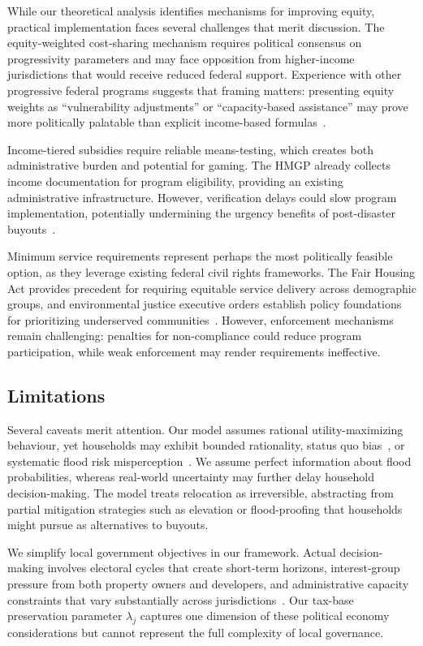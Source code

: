 \documentclass[11pt,letterpaper]{article}
\theoremstyle{definition}
\begin{document}
While our theoretical analysis identifies mechanisms for improving equity, practical implementation faces several challenges that merit discussion. The equity-weighted cost-sharing mechanism requires political consensus on progressivity parameters and may face opposition from higher-income jurisdictions that would receive reduced federal support. Experience with other progressive federal programs suggests that framing matters: presenting equity weights as ``vulnerability adjustments'' or ``capacity-based assistance'' may prove more politically palatable than explicit income-based formulas~\cite{banzhaf2019environmental}.

Income-tiered subsidies require reliable means-testing, which creates both administrative burden and potential for gaming. The HMGP already collects income documentation for program eligibility, providing an existing administrative infrastructure. However, verification delays could slow program implementation, potentially undermining the urgency benefits of post-disaster buyouts~\cite{binder2016framework}.

Minimum service requirements represent perhaps the most politically feasible option, as they leverage existing federal civil rights frameworks. The Fair Housing Act provides precedent for requiring equitable service delivery across demographic groups, and environmental justice executive orders establish policy foundations for prioritizing underserved communities~\cite{bullard2005quest}. However, enforcement mechanisms remain challenging: penalties for non-compliance could reduce program participation, while weak enforcement may render requirements ineffective.

\subsection{Limitations}

Several caveats merit attention. Our model assumes rational utility-maximizing behaviour, yet households may exhibit bounded rationality, status quo bias~\cite{samuelson1988status}, or systematic flood risk misperception~\cite{meyer2017ostrich}. We assume perfect information about flood probabilities, whereas real-world uncertainty may further delay household decision-making. The model treats relocation as irreversible, abstracting from partial mitigation strategies such as elevation or flood-proofing that households might pursue as alternatives to buyouts.

We simplify local government objectives in our framework. Actual decision-making involves electoral cycles that create short-term horizons, interest-group pressure from both property owners and developers, and administrative capacity constraints that vary substantially across jurisdictions~\cite{greer2017political}. Our tax-base preservation parameter $\lambda_j$ captures one dimension of these political economy considerations but cannot represent the full complexity of local governance.
\end{document}
